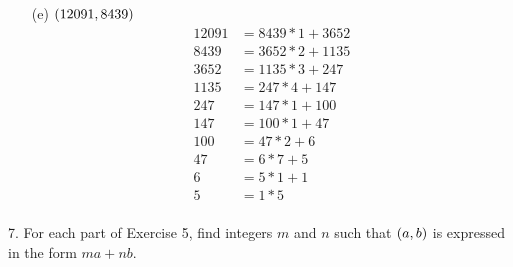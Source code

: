 \begin{mdframed}[style=darkAnswer,frametitle={Joe Starr}]
\begin{multicols}{2}
\begin{itemize}
{    }
    \item [(e)] {$\left(12091,8439\right)$
    \begin{align*}
        12091&=8439*1+3652\\
        8439&=3652*2+1135\\
        3652&=1135*3+247\\
        1135&=247*4+147\\
        247&=147*1+100\\
        147&=100*1+47\\
        100&=47*2+6\\
        47&=6*7+5\\
        6&=5*1+1\\
        5&=1*5\\
    \end{align*}
    }
\end{itemize}
\end{multicols}
\end{mdframed}
\newpage
\begin{mdframed}[style=darkQuesion]
    7.    For each part of Exercise 5, find integers $m$ and $n$ such that 
$\left(a,b\right)$ is expressed in the form $ma+nb$. 

\end{mdframed}

